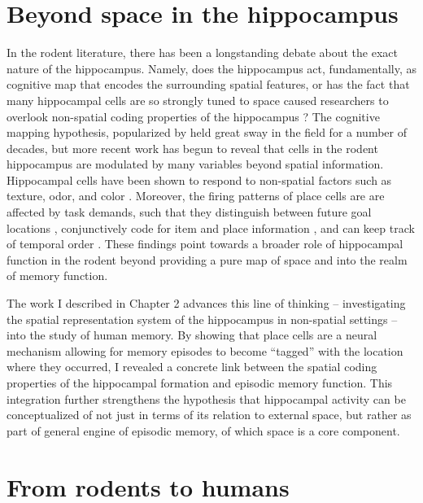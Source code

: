 


\section{Beyond space in the hippocampus}
In the rodent literature, there has been a longstanding debate about the exact nature of the hippocampus. Namely, does the hippocampus act, fundamentally, as cognitive map that encodes the surrounding spatial features, or has the fact that many hippocampal cells are so strongly tuned to space caused researchers to overlook non-spatial coding properties of the hippocampus \citep{EichEtal99}? The cognitive mapping hypothesis, popularized by \citet{OKeeNade78} held great sway in the field for a number of decades, but more recent work has begun to reveal that cells in the rodent hippocampus are modulated by many variables beyond spatial information. Hippocampal cells have been shown to respond to non-spatial factors such as texture, odor, and color \citep{YounEtal94,WoodEtal99,LeutEtal05,IgarEtal14}. Moreover, the firing patterns of place cells are are affected by task demands, such that they distinguish between future goal locations \citep{WoodEtal00,FerbShap03}, conjunctively code for item and place information \citep{KomoEtal09}, and can keep track of temporal order \citep{MannEtal07}. These findings point towards a broader role of hippocampal function in the rodent beyond providing a pure map of space and into the realm of memory function.

The work I described in Chapter 2 advances this line of thinking -- investigating the spatial representation system of the hippocampus in non-spatial settings -- into the study of human memory. By showing that place cells are a neural mechanism allowing for memory episodes to become ``tagged'' with the location where they occurred, I revealed a concrete link between the spatial coding properties of the hippocampal formation and episodic memory function. This integration further strengthens the hypothesis that hippocampal activity can be conceptualized of not just in terms of its relation to external space, but rather as part of general engine of episodic memory, of which space is a core component.

\section{From rodents to humans}

